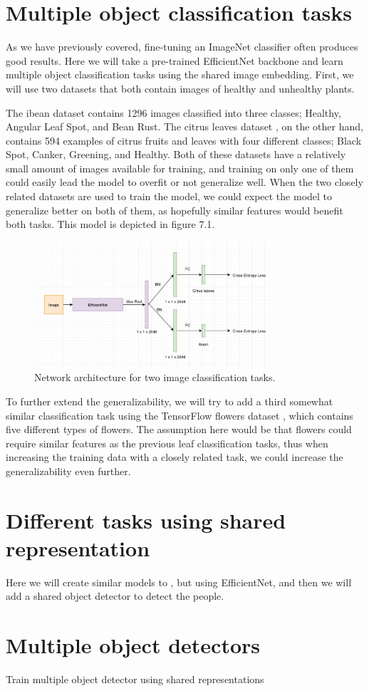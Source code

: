 \section{Multiple object classification tasks}
As we have previously covered, fine-tuning an ImageNet classifier often produces good results.
Here we will take a pre-trained EfficientNet backbone and learn multiple object classification tasks using the shared image embedding.
First, we will use two datasets that both contain images of healthy and unhealthy plants.

The ibean dataset \citep{beansdata} contains 1296 images classified into three classes; Healthy, Angular Leaf Spot, and Bean Rust.
The citrus leaves dataset \citep{citrusdata}, on the other hand, contains 594 examples of citrus fruits and leaves with four different classes; Black Spot, Canker, Greening, and Healthy.
Both of these datasets have a relatively small amount of images available for training, and training on only one of them could easily lead the model to overfit or not generalize well.
When the two closely related datasets are used to train the model, we could expect the model to generalize better on both of them, as hopefully similar features would benefit both tasks.
This model is depicted in figure 7.1.

\begin{figure}[h!]
    \centering
    \includegraphics[width=0.8\textwidth]{imgs/object_classification_architecture.png}
    \caption{Network architecture for two image classification tasks.}
\end{figure}

To further extend the generalizability, we will try to add a third somewhat similar classification task using the TensorFlow flowers dataset \citep{tfflowers}, which contains five different types of flowers.
The assumption here would be that flowers could require similar features as the previous leaf classification tasks, thus when increasing the training data with a closely related task, we could increase the generalizability even further.

\section{Different tasks using shared representation}
Here we will create similar models to \citep{visualPerson}, but using EfficientNet, and then we will add a shared object detector to detect the people.

\section{Multiple object detectors}
Train multiple object detector using shared representations